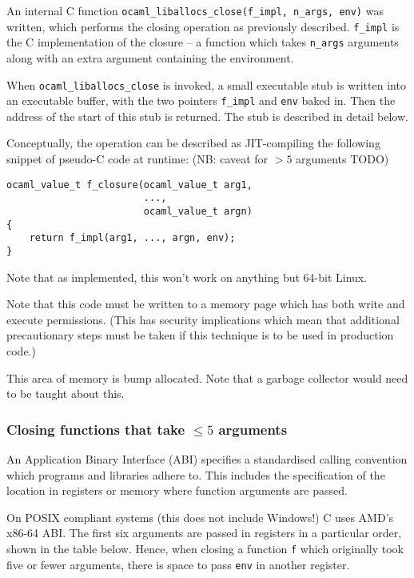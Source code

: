 \documentclass[12pt,a4paper,twoside,openright]{report}
\begin{document}
An internal C function \lstinline{ocaml_liballocs_close(f_impl, n_args, env)}
was written, which performs the closing operation as previously described.
\lstinline!f_impl! is the C implementation of the closure -- a function which
takes \lstinline!n_args! arguments along with an extra argument containing the environment.

When \lstinline!ocaml_liballocs_close! is
invoked, a small executable stub is written into an executable
buffer, with the two pointers \lstinline!f_impl! and \lstinline!env! baked in.
Then the address of the start of this stub is returned. The stub is described
in detail below.

Conceptually, the operation can be described as JIT-compiling the following
snippet of pseudo-C code at runtime: (NB: caveat for $> 5$ arguments TODO)

\begin{lstlisting}
ocaml_value_t f_closure(ocaml_value_t arg1,
                        ...,
                        ocaml_value_t argn)
{
    return f_impl(arg1, ..., argn, env);
}
\end{lstlisting}

Note that as implemented, this won't work on anything but 64-bit Linux.

Note that this code must be written to a memory page which has both write and
execute permissions. (This has security implications which mean that additional
precautionary steps must be taken if this technique is to be used in production
code.)

This area of memory is bump allocated. Note that a garbage collector would need
to be taught about this.

\subsubsection{Closing functions that take $\le 5$ arguments}

An Application Binary Interface (ABI) specifies a standardised calling
convention which programs and libraries adhere to. This includes the
specification of the location in registers or memory where function arguments
are passed.

On POSIX compliant systems (this does not include Windows!) C uses AMD's x86-64
ABI. The first six arguments are passed in registers in a particular order,
shown in the table below. Hence, when closing a function \lstinline!f! which
originally took five or fewer arguments, there is space to pass \lstinline!env!
in another register.
\end{document}
